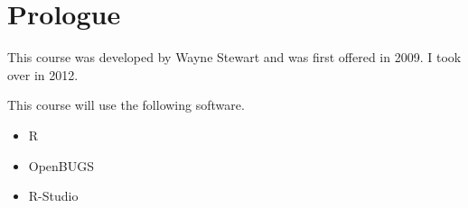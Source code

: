 \section{Prologue}

This course was developed by Wayne Stewart and was first offered in 2009.
I took over in 2012.

This course will use the following software.
\begin{itemize}
\item R
\item OpenBUGS
\item R-Studio
\end{itemize}

